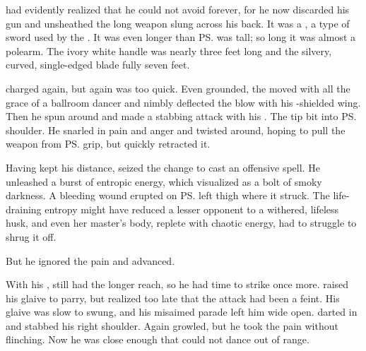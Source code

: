 \begin{garbage}
\index{\senaan}%
\Teshrial{} had evidently realized that he could not avoid \melee{} forever, for he now discarded his gun and unsheathed the long weapon slung across his back. 
It was a \senaan, a type of sword used by the \CiriathSepher. 
It was even longer than \ps{\Teshrial} was tall; so long it was almost a polearm. 
The ivory white handle was nearly three feet long and the silvery, curved, single-edged blade fully seven feet. 


\Ishnaruchaefir{} charged again, but again \Teshrial{} was too quick. 
Even grounded, the \resphan{} moved with all the grace of a ballroom dancer and nimbly deflected the blow with his \kilghan-shielded wing. 
Then he spun around and made a stabbing attack with his \senaan. 
The tip bit into \ps{\Ishnaruchaefir} shoulder. 
He snarled in pain and anger and twisted around, hoping to pull the weapon from \ps{\Teshrial} grip, but \Teshrial{} quickly retracted it. 


Having kept his distance, \Teshrial{} seized the change to cast an offensive spell. 
He unleashed a burst of entropic energy, which \Criseis{} visualized as a bolt of smoky darkness. 
A bleeding wound erupted on \ps{\Ishnaruchaefir} left thigh where it struck. 
The life-draining entropy might have reduced a lesser opponent to a withered, lifeless husk, and even her master's body, replete with chaotic \xsic{} energy, had to struggle to shrug it off. 

But he ignored the pain and advanced. 

With his \senaan, \Teshrial{} still had the longer reach, so he had time to strike once more. 
\Ishnaruchaefir{} raised his glaive to parry, but realized too late that the attack had been a feint. 
His glaive was slow to swung, and his misaimed parade left him wide open. \Teshrial{} darted in and stabbed his right shoulder. 
Again \Ishnaruchaefir{} growled, but he took the pain without flinching. 
Now he was close enough that \Teshrial{} could not dance out of \melee{} range. 


\end{garbage}
